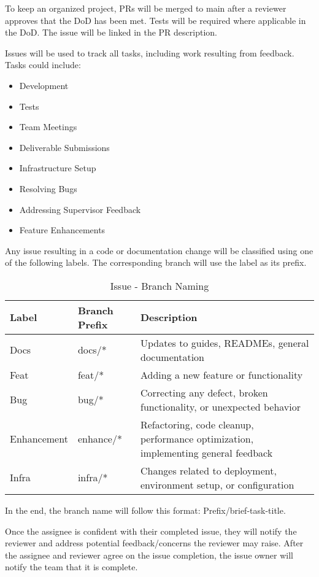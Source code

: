 \documentclass{article}
\begin{document}
\noindent To keep an organized project, PRs will be merged to main after a reviewer approves that the DoD has been met. Tests will be required where applicable in the DoD. The issue will be linked in the PR description.

Issues will be used to track all tasks, including work resulting from feedback. Tasks could include:
\begin{itemize}
    \item Development
    \item Tests
    \item Team Meetings
    \item Deliverable Submissions
    \item Infrastructure Setup
    \item Resolving Bugs
    \item Addressing Supervisor Feedback
    \item Feature Enhancements
\end{itemize}

Any issue resulting in a code or documentation change will be classified using one of the following labels. The corresponding branch will use the label as its prefix.

\begin{table}[hp]
\caption{Issue - Branch Naming} \label{TblIssueBranchNaming}
\begin{tabularx}{\textwidth}{llX}
\toprule
\textbf{Label} & \textbf{Branch Prefix} & \textbf{Description}\\
\midrule
Docs & docs/* & Updates to guides, READMEs, general documentation\\
Feat & feat/* & Adding a new feature or functionality\\
Bug & bug/* & Correcting any defect, broken functionality, or unexpected behavior\\
Enhancement & enhance/* & Refactoring, code cleanup, performance optimization, implementing general feedback\\
Infra & infra/* & Changes related to deployment, environment setup, or configuration\\


\bottomrule
\end{tabularx}
\end{table}

In the end, the branch name will follow this format: Prefix/brief-task-title.

Once the assignee is confident with their completed issue, they will notify the reviewer and address potential feedback/concerns the reviewer may raise. After the assignee and reviewer agree on the issue completion, the issue owner will notify the team that it is complete.
\end{document}
